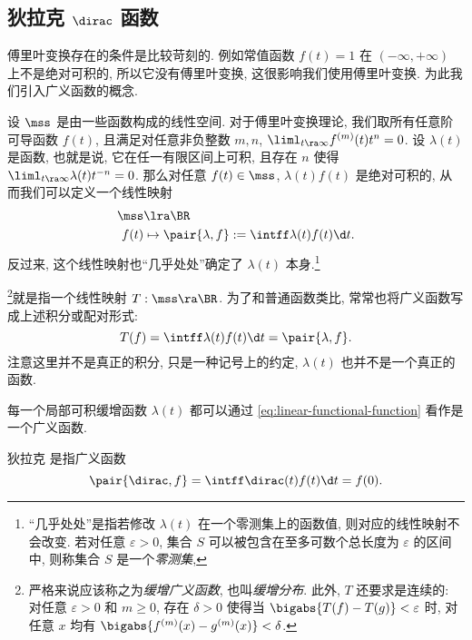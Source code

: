 \subsection{狄拉克 \texorpdfstring{$\dirac$}{δ} 函数}

傅里叶变换存在的条件是比较苛刻的.
例如常值函数 $f(t)=1$ 在 $(-\infty,+\infty)$ 上不是绝对可积的, 所以它没有傅里叶变换, 这很影响我们使用傅里叶变换.
为此我们引入广义函数的概念.

设 $\mss$ 是由一些函数构成的线性空间.
对于傅里叶变换理论, 我们取所有任意阶可导函数 $f(t)$, 且满足对任意非负整数 $m,n$, $\liml_{t\ra\infty}f^{(m)}(t)t^n=0$.
设 $\lambda(t)$ 是函数, 也就是说, 它在任一有限区间上可积, 且存在 $n$ 使得 $\liml_{t\ra\infty}\lambda(t)t^{-n}=0$.
那么对任意 $f(t)\in\mss$, $\lambda(t)f(t)$ 是绝对可积的, 从而我们可以定义一个线性映射
\begin{equation}
  \label{eq:linear-functional-function}
  \begin{aligned}
    \mss&\lra \BR\\
    f(t)&\mapsto \pair{\lambda,f}:=\intff \lambda(t)f(t)\d t.
  \end{aligned}
\end{equation}
反过来, 这个线性映射也``几乎处处''确定了 $\lambda(t)$ 本身.\footnote{
  ``几乎处处''是指若修改 $\lambda(t)$ 在一个零测集上的函数值, 则对应的线性映射不会改变.
  若对任意 $\varepsilon>0$, 集合 $S$ 可以被包含在至多可数个总长度为 $\varepsilon$ 的区间中, 则称集合 $S$ 是一个\emph{零测集}, 
}

\footnote{
  严格来说应该称之为\emph{缓增广义函数}, 也叫\emph{缓增分布}. 此外, $T$ 还要求是连续的: 对任意 $\varepsilon>0$ 和 $m\ge0$, 存在 $\delta>0$ 使得当 $\bigabs{T(f)-T(g)}<\varepsilon$ 时, 对任意 $x$ 均有 $\bigabs{f^{(m)}(x)-g^{(m)}(x)}<\delta$.
}就是指一个线性映射 $T:\mss\ra \BR$.
为了和普通函数类比, 常常也将广义函数写成上述积分或配对形式:
\[
  T(f)=\intff \lambda(t)f(t)\d t=\pair{\lambda,f}.
\]
注意这里并不是真正的积分, 只是一种记号上的约定, $\lambda(t)$ 也并不是一个真正的函数.

每一个局部可积缓增函数 $\lambda(t)$ 都可以通过 \ref{eq:linear-functional-function} 看作是一个广义函数.

\begin{definition}
  狄拉克 \footnotemark 是指广义函数
  \[
    \pair{\dirac,f}=\intff \dirac(t)f(t)\d t=f(0).
  \]
\end{definition}


